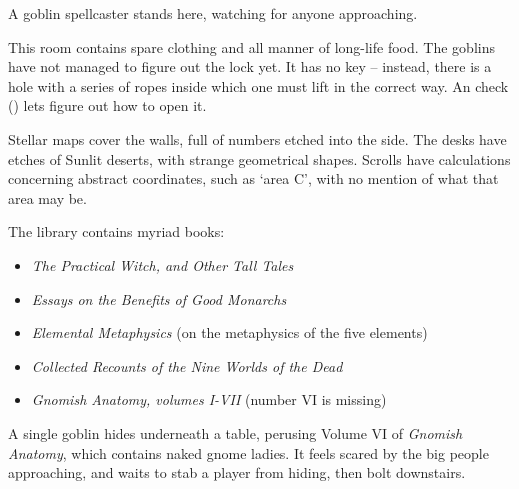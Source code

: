 \begin{multicols}{2}


A goblin spellcaster stands here, watching for anyone approaching.

\goblincaster

\showStdSpells


This room contains spare clothing and all manner of long-life food.
The goblins have not managed to figure out the lock yet.
It has no key -- instead, there is a hole with a series of ropes inside which one must lift in the correct way.
An  check (\tn[10]) lets  figure out how to open it.


\begin{boxtext}

  Stellar maps cover the walls, full of numbers etched into the side.
  The desks have etches of Sunlit deserts, with strange geometrical shapes.
  Scrolls have calculations concerning abstract coordinates, such as `area C', with no mention of what that area may be.

\end{boxtext}


The library contains myriad books:

\begin{itemize}
  \item
  \textit{The Practical Witch, and Other Tall Tales}
  \item
  \textit{Essays on the Benefits of Good Monarchs}
  \item
  \textit{Elemental Metaphysics}
  (on the metaphysics of the five elements)
  \item
  \textit{Collected Recounts of the Nine Worlds of the Dead}
  \item
  \textit{Gnomish Anatomy, volumes I-VII}
  (number VI is missing)
\end{itemize}

\noindent
A single goblin hides underneath a table, perusing Volume VI of \textit{Gnomish Anatomy}, which contains naked gnome ladies.
It feels scared by the big people approaching, and waits to stab a player from hiding, then bolt downstairs.


\end{multicols}
